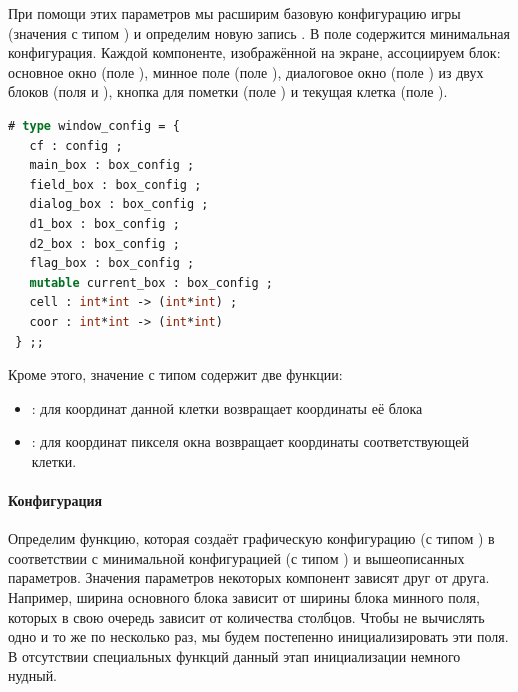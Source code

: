 При помощи этих параметров мы расширим базовую конфигурацию игры (значения с 
типом ) и определим новую запись . В поле 
 содержится минимальная конфигурация. Каждой компоненте, изображённой 
на экране, ассоциируем блок: основное окно (поле ), минное поле 
(поле ), диалоговое окно (поле ) из двух 
блоков (поля  и ), кнопка для пометки (поле 
) и текущая клетка (поле ).

\begin{lstlisting}[language=OCaml]
# type window_config = {
   cf : config ;
   main_box : box_config ;
   field_box : box_config ;
   dialog_box : box_config ;
   d1_box : box_config ;
   d2_box : box_config ;
   flag_box : box_config ;
   mutable current_box : box_config ;
   cell : int*int -> (int*int) ;
   coor : int*int -> (int*int)
 } ;;
\end{lstlisting}

Кроме этого, значение с типом  содержит две функции:

\begin{itemize}
	\item {}: для координат данной клетки возвращает координаты её 
блока

	\item {}: для координат пикселя окна возвращает координаты 
соответствующей клетки.
\end{itemize}

\paragraph{Конфигурация}

Определим функцию, которая создаёт графическую конфигурацию (с типом 
) в соответствии с минимальной конфигурацией (с типом 
) и вышеописанных параметров. Значения параметров некоторых 
компонент зависят друг от друга. Например, ширина основного блока зависит от 
ширины блока минного поля, которых в свою очередь зависит от количества 
столбцов. Чтобы не вычислять одно и то же по несколько раз, мы будем постепенно 
инициализировать эти поля. В отсутствии специальных функций данный этап 
инициализации немного нудный.

